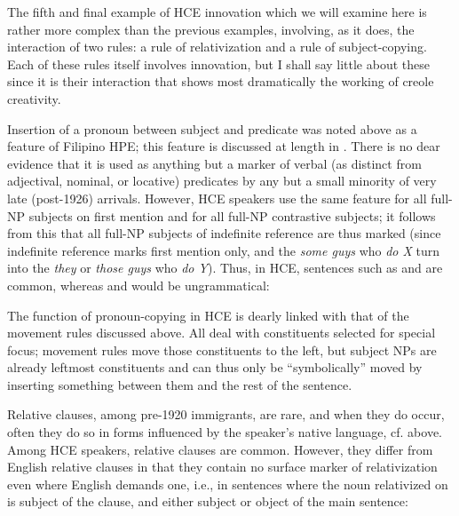 The fifth and final example of HCE innovation which we will examine here is rather more complex than the previous examples, involving, as it does, the interaction of two rules: a rule of relativization and a rule of subject-copying. Each of these rules itself involves inno\-vation, but I shall say little about these since it is their interaction that shows most dramatically the working of creole creativity.

Insertion of a pronoun between subject and predicate was noted above as a feature of Filipino HPE; this feature is discussed at length in \citet[3.6.1]{BickertonEtAl1976a}. There is no dear evidence that it is used as anything but a marker of verbal (as distinct from adjectival, nominal, or locative) predicates by any but a small minority of very late (post-1926) arrivals. However, HCE speakers use the same feature for all full-NP subjects on first mention and for all full-NP contrastive subjects; it follows from this that all full-NP subjects of indefinite refer\-ence are thus marked (since indefinite reference marks first mention only, and the \textit{some guys} who \textit{do X} turn into the \textit{they} or \textit{those guys} who \textit{do Y}). Thus, in HCE, sentences such as  and  are common, whereas  and  would be ungrammatical:

\z

\z

\z

\z

\noindent The function of pronoun-copying in HCE is dearly linked with that of the movement rules discussed above. All deal with constituents selected for special focus; movement rules move those constituents to the left, but subject NPs are already leftmost constituents and can thus only be ``symbolically'' moved by inserting something between them and the rest of the sentence.

Relative clauses, among pre-1920 immigrants, are rare, and when they do occur, often they do so in forms influenced by the speaker's native language, cf.  above. Among HCE speakers, relative clauses are common. However, they differ from English relative clauses in that they contain no surface marker of relativization even where English demands one, i.e., in sentences where the noun relativized on is sub\-ject of the clause, and either subject  or object  of the main sentence:

